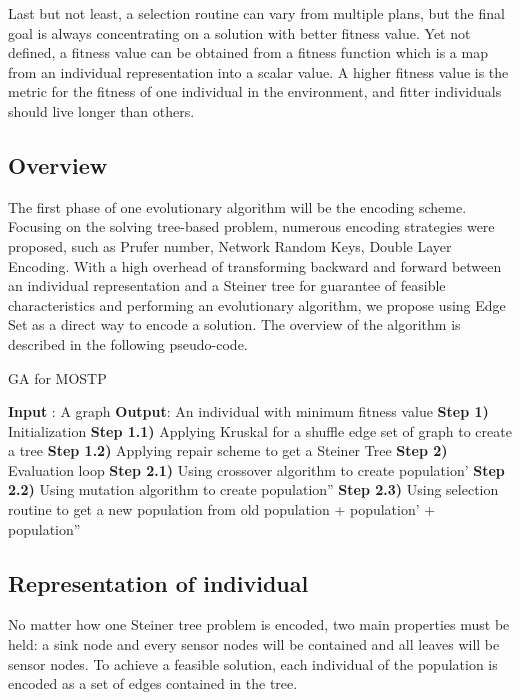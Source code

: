 	Last but not least, a selection routine can vary from multiple plans, but the final goal is always concentrating on a solution with better fitness value. Yet not defined, a fitness value can be obtained from a fitness function which is a map from an individual representation into a scalar value. A higher fitness value is the metric for the fitness of one individual in the environment, and fitter individuals should live longer than others.

\subsection{Overview}
	The first phase of one evolutionary algorithm will be the encoding scheme. Focusing on the solving tree-based problem, numerous encoding strategies were proposed, such as Prufer number, Network Random Keys, Double Layer Encoding. With a high overhead of transforming backward and forward between an individual representation and a Steiner tree for guarantee of feasible characteristics and performing an evolutionary algorithm, we propose using Edge Set as a direct way to encode a solution. The overview of the algorithm is described in the following pseudo-code.

\begin{algorithm}
\caption{GA for MOSTP}
\begin{algorithmic}[0]
\State \textbf{Input} : A graph
\State \textbf{Output}: An individual with minimum fitness value
\State \textbf{Step 1)} Initialization
		\State \textbf{Step 1.1)} Applying Kruskal for a shuffle edge set of graph to create a tree
		\State \textbf{Step 1.2)} Applying repair scheme to get a Steiner Tree
	\EndFor
\State \textbf{Step 2)} Evaluation loop
		\State \textbf{Step 2.1)} Using crossover algorithm to create population'
		\State \textbf{Step 2.2)} Using mutation algorithm to create population''
		\State \textbf{Step 2.3)} Using selection routine to get a new population from old population + population' + population''
	\EndWhile
\end{algorithmic}
\end{algorithm}

\subsection{Representation of individual}
	No matter how one Steiner tree problem is encoded, two main properties must be held: a sink node and every sensor nodes will be contained and all leaves will be sensor nodes. To achieve a feasible solution, each individual of the population is encoded as a set of edges contained in the tree.

